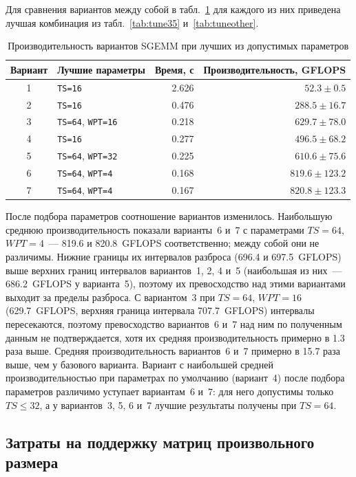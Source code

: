 \documentclass[a4paper]{article}
\begin{document}
Для сравнения вариантов между собой в табл.~\ref{tab:best} для каждого
из них приведена лучшая комбинация из табл.~\ref{tab:tune35}
и~\ref{tab:tuneother}.

\begin{table}[h!]
\centering
\caption{Производительность вариантов SGEMM при лучших из допустимых параметров}
\label{tab:best}
\begin{tabular}{c l r r}
\toprule
Вариант & Лучшие параметры & Время, с & Производительность, GFLOPS \\
\midrule
1 & \texttt{TS=16}                  & 2.626 & $52.3 \pm 0.5$ \\
2 & \texttt{TS=16}                  & 0.476 & $288.5 \pm 16.7$ \\
3 & \texttt{TS=64}, \texttt{WPT=16} & 0.218 & $629.7 \pm 78.0$ \\
4 & \texttt{TS=16}                  & 0.277 & $496.5 \pm 68.2$ \\
5 & \texttt{TS=64}, \texttt{WPT=32} & 0.225 & $610.6 \pm 75.6$ \\
6 & \texttt{TS=64}, \texttt{WPT=4}  & 0.168 & $819.6 \pm 123.2$ \\
7 & \texttt{TS=64}, \texttt{WPT=4}  & 0.167 & $820.8 \pm 123.3$ \\
\bottomrule
\end{tabular}
\end{table}

После подбора параметров соотношение вариантов изменилось.
Наибольшую среднюю производительность показали варианты~6 и~7 с
параметрами $TS=64$, $WPT=4$~--- 819.6 и 820.8~GFLOPS соответственно;
между собой они не различимы. Нижние границы их интервалов разброса
(696.4 и 697.5~GFLOPS) выше верхних границ интервалов вариантов~1, 2,
4 и~5 (наибольшая из них~--- 686.2~GFLOPS у варианта~5), поэтому их
превосходство над этими вариантами выходит за пределы разброса.
С вариантом~3 при $TS=64$, $WPT=16$ (629.7~GFLOPS, верхняя граница
интервала 707.7~GFLOPS) интервалы пересекаются, поэтому превосходство
вариантов~6 и~7 над ним по полученным данным не подтверждается, хотя
их средняя производительность примерно в 1.3 раза выше. Средняя
производительность вариантов~6 и~7 примерно в 15.7 раза выше, чем у
базового варианта. Вариант с наибольшей средней производительностью
при параметрах по умолчанию (вариант~4) после подбора параметров
различимо уступает вариантам~6 и~7: для него допустимы только
$TS \le 32$, а у вариантов~3, 5, 6 и~7 лучшие результаты получены
при $TS=64$.

\subsection{Затраты на поддержку матриц произвольного размера}
\label{sec:v10}
\end{document}
